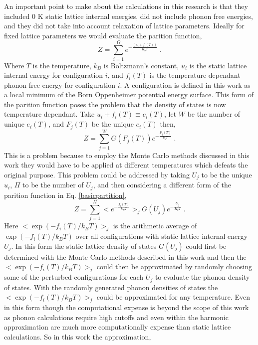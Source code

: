 \documentclass[aps,pre,reprint,superscriptaddress,showkeys]{revtex4-1}
\begin{document}
  An important point to make about the calculations in this research is that they  included 0 K static lattice internal energies, did not include phonon free energies, and they did not take into account relaxation of lattice parameters\cite{Holzwarth_group}. Ideally for fixed lattice parameters we would evaluate the parition function\cite{partition}, 
\begin{equation}
Z = \sum_{i=1}^{\Omega} e^{-\frac{(u_i + f_i(T))}{K_bT}}\;.
\label{basicpartition}
\end{equation}
 Where $T$ is the temperature, $k_B$ is Boltzmann's constant, $u_i$ is the static lattice internal energy for configuration $i$, and $f_i(T)$ is the temperature dependant phonon free energy for configuration $i$. A configuration is defined in this work as a local minimum of the Born Oppenheimer potential energy surface. This form of the parition function poses the problem that the density of states is now temperature dependant.  Take $u_i + f_i(T)\equiv e_i(T)$, let $W$ be the number of unique $e_i(T)$, and $F_j(T)$ be the unique $e_i(T)$ then, 
 \begin{equation}
 Z = \sum_{j=1}^{W}G(F_j(T))e^{-\frac{F_j(T)}{k_bT}}\;.
 \end{equation}
 This is a problem because to employ the Monte Carlo methods discussed in this work they would have to be applied at different temperatures which defeats the original purpose. This problem could be addressed by taking $U_j$ to be the unique $u_i$, $\Pi$ to be the number of $U_j$, and then considering a different form of the parition function in Eq. \ref{basicpartition}, 
 \begin{equation}
 Z= \sum_{j=1}^{\Pi}<e^{-\frac{f_i(T)}{k_BT}}>_jG(U_j)e^{-\frac{U_j}{K_bT}}\;.
 \end{equation}
 Here $<\exp(-f_i(T)/k_BT)>_j$ is the arithmetic average of $\exp(-f_i(T)/k_BT)$ over all configurations with static lattice internal energy $U_j$. In this form the static lattice density of states $G(U_j)$ could first be determined with the Monte Carlo methods described in this work and then the $<\exp(-f_i(T)/k_BT)>_j$ could then be approximated by randomly choosing some of the perturbed configurations for each $U_j$ to evaluate the phonon density of states. With the randomly generated phonon densities of states the $<\exp(-f_i(T)/k_BT)>_j$ could be approximated for any temperature. Even in this form though the computational expense is beyond the scope of this work as phonon calculations require high cutoffs and even within the harmonic approximation are much more computationally expense than static lattice calculations\cite{dfpt_phonons}. So in this work the approximation, 
\end{document}
